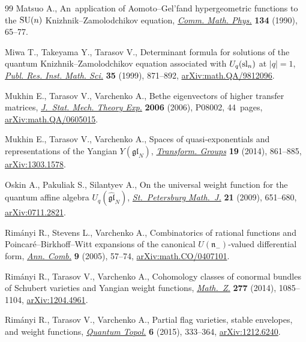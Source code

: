 \documentclass[pdftex]{sigma}
\numberwithin{equation}{section}
\begin{document}
\begin{thebibliography}{99}
Matsuo A., An~application of {A}omoto--{G}el'fand hypergeometric functions to
 the {${\rm SU}(n)$} {K}nizhnik--{Z}amolodchikov equation,
 \href{https://doi.org/10.1007/BF02102089}{\textit{Comm. Math. Phys.}}
 \textbf{134} (1990), 65--77.

Miwa T., Takeyama Y., Tarasov V., Determinant formula for solutions of the
 quantum {K}nizhnik--{Z}amolodchikov equation associated with {$U_q({\rm
 sl}_n)$} at {$|q|=1$},
 \href{https://doi.org/10.2977/prims/1195143360}{\textit{Publ. Res. Inst.
 Math. Sci.}} \textbf{35} (1999), 871--892,
 \href{http://arxiv.org/abs/math.QA/9812096}{arXiv:math.QA/9812096}.

Mukhin E., Tarasov V., Varchenko A., Bethe eigenvectors of higher transfer
 matrices,
 \href{https://doi.org/10.1088/1742-5468/2006/08/p08002}{\textit{J.~Stat.
 Mech. Theory Exp.}} \textbf{2006} (2006), P08002, 44~pages,
 \href{http://arxiv.org/abs/math.QA/0605015}{arXiv:math.QA/0605015}.

Mukhin E., Tarasov V., Varchenko A., Spaces of quasi-exponentials and
 representations of the {Y}angian {$Y(\mathfrak{gl}_N)$},
 \href{https://doi.org/10.1007/s00031-014-9275-8}{\textit{Transform. Groups}}
 \textbf{19} (2014), 861--885,
 \href{http://arxiv.org/abs/1303.1578}{arXiv:1303.1578}.

Oskin A., Pakuliak S., Silantyev A., On the universal weight function for the
 quantum affine algebra {$U_q(\widehat{\mathfrak{gl}}_N)$},
 \href{https://doi.org/10.1090/S1061-0022-2010-01110-5}{\textit{St.~Petersburg
 Math.~J.}} \textbf{21} (2009), 651--680,
 \href{http://arxiv.org/abs/0711.2821}{arXiv:0711.2821}.

Rim\'anyi R., Stevens L., Varchenko A., Combinatorics of rational functions and
 {P}oincar\'e--{B}irkhoff--{W}itt expansions of the canonical
 {$U(\mathfrak{n}_-)$}-valued differential form,
 \href{https://doi.org/10.1007/s00026-005-0241-3}{\textit{Ann. Comb.}}
 \textbf{9} (2005), 57--74,
 \href{http://arxiv.org/abs/math.CO/0407101}{arXiv:math.CO/0407101}.

Rim\'anyi R., Tarasov V., Varchenko A., Cohomology classes of conormal bundles
 of {S}chubert varieties and {Y}angian weight functions,
 \href{https://doi.org/10.1007/s00209-014-1295-5}{\textit{Math.~Z.}}
 \textbf{277} (2014), 1085--1104,
 \href{http://arxiv.org/abs/1204.4961}{arXiv:1204.4961}.

Rim\'anyi R., Tarasov V., Varchenko A., Partial flag varieties, stable
 envelopes, and weight functions,
 \href{https://doi.org/10.4171/QT/65}{\textit{Quantum Topol.}} \textbf{6}
 (2015), 333--364, \href{http://arxiv.org/abs/1212.6240}{arXiv:1212.6240}.


\end{thebibliography}
\end{document}
